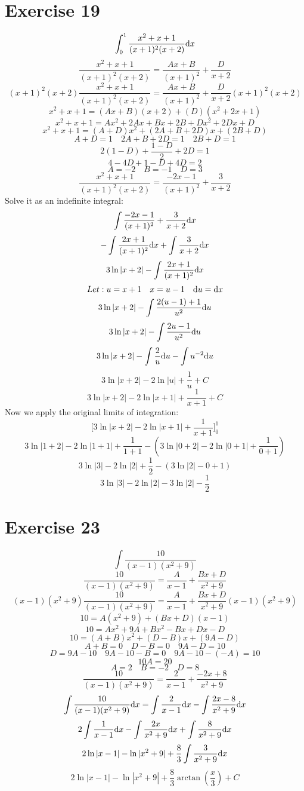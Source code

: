 \documentclass{math}
\begin{document}
\section*{Exercise 19}
\[ \int_{0}^{1}{\frac{x^{2}+x+1}{(x+1)^{2}(x+2)}\mathrm{d}{x}} \]
\[ \frac{x^{2}+x+1}{(x+1)^{2}(x+2)} = \frac{Ax+B}{(x+1)^{2}}+\frac{D}{x+2} \]
\[ (x+1)^{2}(x+2)\frac{x^{2}+x+1}{(x+1)^{2}(x+2)} =
   \frac{Ax+B}{(x+1)^{2}}+\frac{D}{x+2}(x+1)^{2}(x+2) \]
\[ x^{2}+x+1 = (Ax+B)(x+2)+(D)(x^{2}+2x+1) \]
\[ x^{2}+x+1 = Ax^{2}+2Ax+Bx+2B+Dx^{2}+2Dx+D \]
\[ x^{2}+x+1 = (A+D)x^{2}+(2A+B+2D)x+(2B+D) \]
\[ A+D = 1 \quad 2A+B+2D = 1 \quad 2B+D = 1 \]
\[ 2(1-D)+\frac{1-D}{2}+2D = 1 \]
\[ 4-4D+1-D+4D = 2 \]
\[ A = -2 \quad B = -1 \quad D = 3 \]
\[ \frac{x^{2}+x+1}{(x+1)^{2}(x+2)} = \frac{-2x-1}{(x+1)^{2}}+\frac{3}{x+2} \]
Solve it as an indefinite integral:
\[ \int{\frac{-2x-1}{(x+1)^{2}}+\frac{3}{x+2}\mathrm{d}{x}} \]
\[ -\int{\frac{2x+1}{(x+1)^{2}}\mathrm{d}{x}}+\int{\frac{3}{x+2}\mathrm{d}{x}} \]
\[ 3\ln|x+2|-\int{\frac{2x+1}{(x+1)^{2}}\mathrm{d}{x}} \]
\[ Let: u = x+1 \quad x = u-1 \quad \mathrm{d}{u}=\mathrm{d}{x} \]
\[ 3\ln|x+2|-\int{\frac{2(u-1)+1}{u^{2}}\mathrm{d}{u}} \]
\[ 3\ln|x+2|-\int{\frac{2u-1}{u^{2}}\mathrm{d}{u}} \]
\[ 3\ln|x+2|-\int{\frac{2}{u}\mathrm{d}{u}}-\int{u^{-2}\mathrm{d}{u}} \]
\[ 3\ln|x+2|-2\ln|u|+\frac{1}{u}+C \]
\[ 3\ln|x+2|-2\ln|x+1|+\frac{1}{x+1}+C \]
Now we apply the original limits of integration:
\[ \bigg[3\ln|x+2|-2\ln|x+1|+\frac{1}{x+1}\bigg]_{0}^{1} \]
\[ 3\ln|1+2|-2\ln|1+1|+\frac{1}{1+1}-(3\ln|0+2|-2\ln|0+1|+\frac{1}{0+1}) \]
\[ 3\ln|3|-2\ln|2|+\frac{1}{2}-(3\ln|2|-0+1) \]
\[ 3\ln|3|-2\ln|2|-3\ln|2|-\frac{1}{2} \]

\section*{Exercise 23}
\[ \int{\frac{10}{(x-1)(x^{2}+9)}} \]
\[ \frac{10}{(x-1)(x^{2}+9)} = \frac{A}{x-1}+\frac{Bx+D}{x^{2}+9} \]
\[ (x-1)(x^{2}+9)\frac{10}{(x-1)(x^{2}+9)} =
   \frac{A}{x-1}+\frac{Bx+D}{x^{2}+9}(x-1)(x^{2}+9) \]
\[ 10 = A(x^{2}+9)+(Bx+D)(x-1) \]
\[ 10 = Ax^{2}+9A+Bx^{2}-Bx+Dx-D \]
\[ 10 = (A+B)x^{2}+(D-B)x+(9A-D) \]
\[ A+B = 0 \quad D-B = 0 \quad 9A-D = 10 \]
\[ D = 9A-10 \quad 9A-10-B = 0 \quad 9A-10-(-A) = 10 \]
\[ 10A = 20 \]
\[ A = 2 \quad B = -2 \quad D = 8 \]
\[ \frac{10}{(x-1)(x^{2}+9)} = \frac{2}{x-1}+\frac{-2x+8}{x^{2}+9} \]
\[ \int{\frac{10}{(x-1)(x^{2}+9)}\mathrm{d}{x}} =
   \int{\frac{2}{x-1}\mathrm{d}{x}}-\int{\frac{2x-8}{x^{2}+9}\mathrm{d}{x}} \]
\[ 2\int{\frac{1}{x-1}\mathrm{d}{x}}-\int{\frac{2x}{x^{2}+9}\mathrm{d}{x}}+
   \int{\frac{8}{x^{2}+9}\mathrm{d}{x}} \]
\[ 2\ln|x-1|-\ln|x^{2}+9|+\frac{8}{3}\int{\frac{3}{x^{2}+9}\mathrm{d}{x}} \]
\[ 2\ln|x-1|-\ln|x^{2}+9|+\frac{8}{3}\arctan(\frac{x}{3})+C \]
\end{document}
